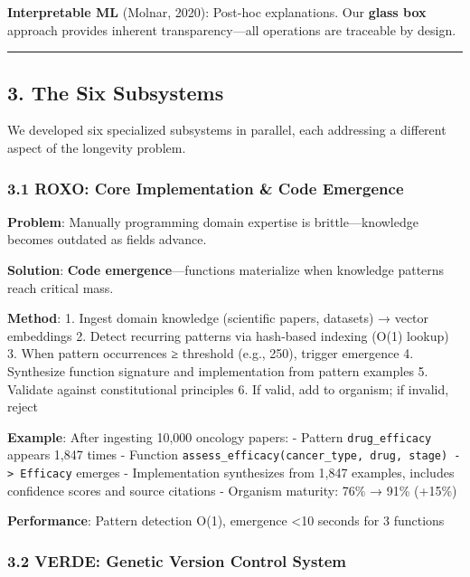 \documentclass[
]{article}
\begin{document}
\textbf{Interpretable ML} (Molnar, 2020): Post-hoc explanations. Our
\textbf{glass box} approach provides inherent transparency---all
operations are traceable by design.

\begin{center}\rule{0.5\linewidth}{0.5pt}\end{center}

\subsection{3. The Six Subsystems}\label{the-six-subsystems}

We developed six specialized subsystems in parallel, each addressing a
different aspect of the longevity problem.

\subsubsection{3.1 ROXO: Core Implementation \& Code
Emergence}\label{roxo-core-implementation-code-emergence}

\textbf{Problem}: Manually programming domain expertise is
brittle---knowledge becomes outdated as fields advance.

\textbf{Solution}: \textbf{Code emergence}---functions materialize when
knowledge patterns reach critical mass.

\textbf{Method}: 1. Ingest domain knowledge (scientific papers,
datasets) → vector embeddings 2. Detect recurring patterns via
hash-based indexing (O(1) lookup) 3. When pattern occurrences ≥
threshold (e.g., 250), trigger emergence 4. Synthesize function
signature and implementation from pattern examples 5. Validate against
constitutional principles 6. If valid, add to organism; if invalid,
reject

\textbf{Example}: After ingesting 10,000 oncology papers: - Pattern
\texttt{drug\_efficacy} appears 1,847 times - Function
\texttt{assess\_efficacy(cancer\_type,\ drug,\ stage)\ -\textgreater{}\ Efficacy}
emerges - Implementation synthesizes from 1,847 examples, includes
confidence scores and source citations - Organism maturity: 76\% → 91\%
(+15\%)

\textbf{Performance}: Pattern detection O(1), emergence \textless10
seconds for 3 functions

\subsubsection{3.2 VERDE: Genetic Version Control
System}\label{verde-genetic-version-control-system}
\end{document}
